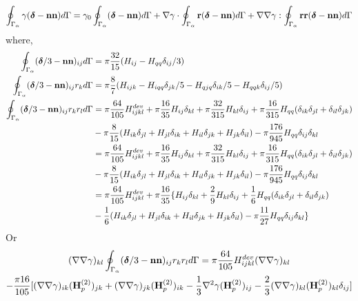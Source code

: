 \begin{equation}
    \oint_{\Gamma_{\alpha}} \gamma (\bm\delta - \textbf{nn}) d\Gamma
    =
    \gamma_0 \oint_{\Gamma_{\alpha}}  (\bm\delta - \textbf{nn}) d\Gamma
    + \mathbf{\nabla}\gamma \cdot \oint_{\Gamma_{\alpha}} \textbf{r} (\bm\delta - \textbf{nn}) d\Gamma
    + \mathbf{\nabla}\mathbf{\nabla}\gamma : \oint_{\Gamma_{\alpha}} \textbf{rr} (\bm\delta - \textbf{nn}) d\Gamma
\end{equation}
where, 
\begin{align*}
    \oint_{\Gamma_{\alpha}}  (\bm\delta/3 - \textbf{nn})_{ij} d\Gamma &= \pi\frac{32}{15} (H_{ij}- H_{qq} \delta_{ij}/3)\\
    \oint_{\Gamma_{\alpha}}  (\bm\delta/3 - \textbf{nn})_{ij}r_k d\Gamma &= \pi\frac{8}{7} (H_{ijk} - H_{iqq} \delta_{jk}/5- H_{qjq} \delta_{ik}/5- H_{qqk} \delta_{ij}/5)\\
    \oint_{\Gamma_{\alpha}}  (\bm\delta/3 - \textbf{nn})_{ij}r_kr_l d\Gamma &= 
    \pi\frac{64}{105} H_{ijkl}^{dev} 
    + \pi\frac{16}{35} H_{ij}\delta_{kl}
    + \pi\frac{32}{315} H_{kl}\delta_{ij}
    + \pi\frac{16}{315} H_{qq}(\delta_{ik}\delta_{jl}+\delta_{il}\delta_{jk})\\
    &- \pi\frac{8}{15} (H_{ik}\delta_{jl}+ H_{jl}\delta_{ik}+H_{il}\delta_{jk}+H_{jk}\delta_{il})
    - \pi\frac{176}{945} H_{qq}\delta_{ij}\delta_{kl}\\
    &=\pi\frac{64}{105} H_{ijkl}^{dev} 
    + \pi\frac{16}{35} H_{ij}\delta_{kl}
    + \pi\frac{32}{315} H_{kl}\delta_{ij}
    + \pi\frac{16}{315} H_{qq}(\delta_{ik}\delta_{jl}+\delta_{il}\delta_{jk})\\
    &- \pi\frac{8}{15} (H_{ik}\delta_{jl}+ H_{jl}\delta_{ik}+H_{il}\delta_{jk}+H_{jk}\delta_{il})
    - \pi\frac{176}{945} H_{qq}\delta_{ij}\delta_{kl}\\
    &=\pi\frac{64}{105} H_{ijkl}^{dev} 
    + \pi\frac{16}{35} \{
        H_{ij}\delta_{kl}
        + \frac{2}{9} H_{kl}\delta_{ij}
        + \frac{1}{6} H_{qq}(\delta_{ik}\delta_{jl}+\delta_{il}\delta_{jk})\\
        &- \frac{1}{6} (H_{ik}\delta_{jl}+ H_{jl}\delta_{ik}+H_{il}\delta_{jk}+H_{jk}\delta_{il})
        - \pi\frac{11}{27} H_{qq}\delta_{ij}\delta_{kl}\}
\end{align*}
Or 
\begin{multline*}
    (\mathbf{\nabla}\mathbf{\nabla} \gamma )_{kl}
    \oint_{\Gamma_{\alpha}}  (\bm\delta/3 - \textbf{nn})_{ij}r_kr_l d\Gamma
    =
    \pi\frac{64}{105} H_{ijkl}^{dev} (\mathbf{\nabla}\mathbf{\nabla} \gamma)_{kl}\\
    -\frac{\pi 16}{105} [
        (\mathbf{\nabla}\mathbf{\nabla} \gamma)_{ik} (\textbf{H}_p^{(2)})_{jk}
        + (\mathbf{\nabla}\mathbf{\nabla} \gamma)_{jk} (\textbf{H}_p^{(2)})_{ik}
        -\frac{1}{3}\mathbf{\nabla}^2 \gamma (\textbf{H}_p^{(2)})_{ij}
        -\frac{2}{3}(\mathbf{\nabla}\mathbf{\nabla} \gamma)_{kl} (\textbf{H}_p^{(2)})_{kl}\delta_{ij}
        ]
\end{multline*}

